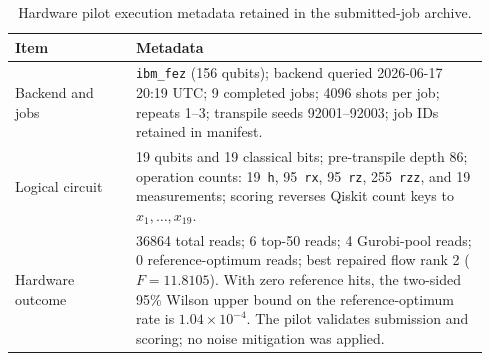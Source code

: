 \documentclass[10pt,letterpaper]{article}
\begin{document}
\begin{table}[t]
\centering
\footnotesize
\caption{Hardware pilot execution metadata retained in the submitted-job archive.}
\label{tab:supp-hardware-provenance}
\setlength{\tabcolsep}{3pt}
\begin{tabular}{L{0.24\linewidth}L{0.70\linewidth}}
\hline
Item & Metadata \\
\hline
Backend and jobs &
\texttt{ibm\_fez} (156 qubits); backend queried 2026-06-17 20:19 UTC;
9 completed jobs; 4096 shots per job; repeats 1--3; transpile seeds
92001--92003; job IDs retained in manifest. \\
\hline
Logical circuit &
19 qubits and 19 classical bits; pre-transpile depth 86; operation counts:
19~\texttt{h}, 95~\texttt{rx}, 95~\texttt{rz}, 255~\texttt{rzz}, and
19 measurements; scoring reverses Qiskit count keys to $x_1,\ldots,x_{19}$. \\
\hline
Hardware outcome &
36864 total reads; 6 top-50 reads; 4 Gurobi-pool reads;
0 reference-optimum reads; best repaired flow rank 2 ($F=11.8105$).
With zero reference hits, the two-sided 95\% Wilson upper bound on the
reference-optimum rate is $1.04\times 10^{-4}$. The pilot validates
submission and scoring; no noise mitigation was applied. \\
\hline
\end{tabular}
\end{table}
\end{document}
